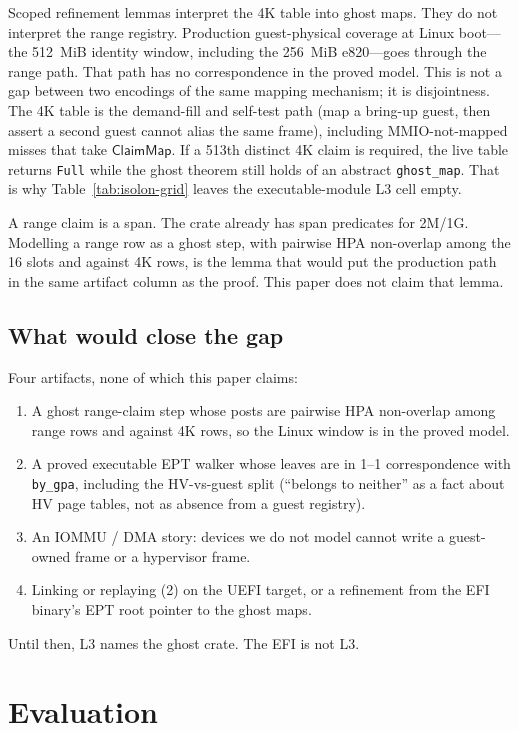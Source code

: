 \documentclass[sigplan,10pt,anonymous]{acmart}
\begin{document}
Scoped refinement lemmas interpret the 4K table into ghost maps. They do
not interpret the range registry. Production guest-physical coverage at
Linux boot---the 512~MiB identity window, including the 256~MiB e820---goes
through the range path. That path has no correspondence in the proved
model. This is not a gap between two encodings of the same mapping
mechanism; it is disjointness. The 4K table is the demand-fill and
self-test path (map a bring-up guest, then assert a second guest cannot
alias the same frame), including MMIO-not-mapped misses that take
$\mathsf{ClaimMap}$. If a 513th distinct 4K claim is required, the live
table returns \texttt{Full} while the ghost theorem still holds of an
abstract \texttt{ghost\_map}. That is why Table~\ref{tab:isolon-grid}
leaves the executable-module L3 cell empty.

A range claim is a span. The crate already has span predicates for 2M/1G.
Modelling a range row as a ghost step, with pairwise HPA non-overlap among
the 16 slots and against 4K rows, is the lemma that would put the
production path in the same artifact column as the proof. This paper does
not claim that lemma.

\subsection{What would close the gap}

Four artifacts, none of which this paper claims:

\begin{enumerate}
\item A ghost range-claim step whose posts are pairwise HPA non-overlap
  among range rows and against 4K rows, so the Linux window is in the
  proved model.
\item A proved executable EPT walker whose leaves are in 1--1
  correspondence with \texttt{by\_gpa}, including the HV-vs-guest split
  (``belongs to neither'' as a fact about HV page tables, not as absence
  from a guest registry).
\item An IOMMU / DMA story: devices we do not model cannot write a
  guest-owned frame or a hypervisor frame.
\item Linking or replaying (2) on the UEFI target, or a refinement from
  the EFI binary's EPT root pointer to the ghost maps.
\end{enumerate}

Until then, L3 names the ghost crate. The EFI is not L3.

\section{Evaluation}
\end{document}
